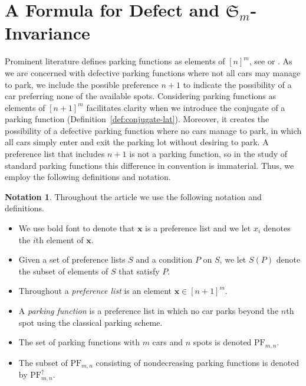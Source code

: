 \documentclass[11pt,reqno]{BICA}
\theoremstyle{definition}
\newtheorem{notation}[theorem]{Notation}
\newcommand{\NDPF}{\mathrm{PF}^{\uparrow}}
\newcommand{\PF}{\mathrm{PF}}
\newcommand{\x}{\mathbf{x}}
\begin{document}
\section{A Formula for Defect and \texorpdfstring{$\mathfrak{S}_m$}{Sn}-Invariance}\label{sec:background}
Prominent literature defines parking functions as elements of $[n]^m$, see \cite{Konheim_Weiss} or \cite[Exercise 5.29.\ a.]{StanleyECVol2}. As we are concerned with defective parking functions where not all cars may manage to park, we include the possible preference $n+1$ to indicate the possibility of a car preferring none of the available spots. Considering parking functions as elements of $[n+1]^m$ facilitates clarity when we introduce the conjugate of a parking function (Definition~\ref{def:conjugate-lat}). Moreover, it creates the possibility of a defective parking function where no cars manage to park, in which all cars simply enter and exit the parking lot without desiring to park. 
A  preference list that includes $n+1$ is not a parking function, so in the study of standard parking functions this difference in convention is immaterial.
Thus, we employ the following definitions and notation.

\begin{notation} \label{notation}Throughout the article we use the following notation and definitions.
\begin{itemize}[leftmargin=.2in]
\item We use bold font to denote that $\x$ is a  preference list and we let $x_i$ denotes the $i$th element of $\x$.
\item Given a set of preference lists $S$ and a condition $P$ on $S$, we let $S(P)$ denote the subset of elements of $S$ that satisfy $P$.
\item Throughout a \textit{preference list} is an element $\x \in[n+1]^m$.
\item A \textit{parking function} is a preference list in which no car parks beyond the $n$th spot using the classical parking scheme.
\item The set of parking functions with $m$ cars and $n$ spots is denoted $\PF_{m,n}$.
\item  The subset  of $\PF_{m,n}$ consisting of nondecreasing parking functions is denoted by $\NDPF_{m,n}$. 
\end{itemize}
\end{notation}

\end{document}
